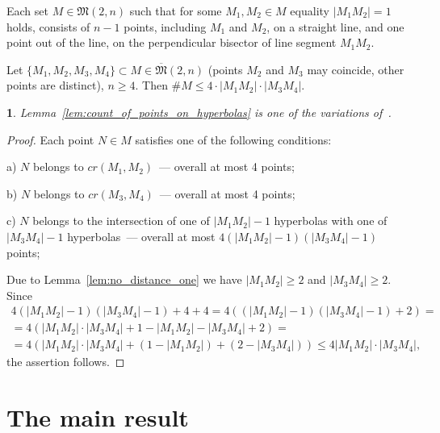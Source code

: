 \documentclass[11pt,twoside,draft
]{article}
\newtheorem{Remark}{\indent {\sc Remark}}
\begin{document}
\begin{lemma}
	\cite[Theorem 3.10]{my-pps-linear-bound-2019}
	\label{lem:no_distance_one}
	Each set $M\in\mathfrak{M}(2,n)$
	such that for some $M_1,M_2 \in M$ equality $|M_1 M_2|=1$ holds,
	consists of $n-1$ points, including $M_1$ and $M_2$, on a straight line,
	and one point out of the line, on the perpendicular bisector of line segment $M_1 M_2$.
\end{lemma}


\begin{lemma}
	\label{lem:count_of_points_on_hyperbolas}
	Let $\{M_1, M_2, M_3, M_4\} \subset M\in\overline{\mathfrak{M}}(2,n)$
	(points $M_2$ and $M_3$ may coincide, other points are distinct), $n\geq 4$.
	Then $\# M \leq 4 \cdot |M_1 M_2| \cdot |M_3 M_4|$.
\end{lemma}

\begin{Remark}
	Lemma~\ref{lem:count_of_points_on_hyperbolas} is one of the variations of~\cite{erdos1945integral}.
\end{Remark}

\begin{proof}[Proof]
	Each point $N\in M$ satisfies one of the following conditions:

	a) $N$ belongs to $cr(M_1,M_2)$~--- overall at most 4 points;

	b) $N$ belongs to $cr(M_3,M_4)$~--- overall at most 4 points;

	c) $N$ belongs to the intersection of one of $|M_1 M_2| - 1$ hyperbolas
	with one of $|M_3 M_4| - 1$ hyperbolas~--- overall at most $4 (|M_1 M_2| - 1)(|M_3 M_4| - 1)$ points;

	Due to Lemma~\ref{lem:no_distance_one} we have $|M_1 M_2| \geq 2$ and $|M_3 M_4| \geq 2$.
	Since
	\begin{multline}
		4 (|M_1 M_2| - 1)(|M_3 M_4| - 1) + 4 + 4
		=
		4 ( (|M_1 M_2| - 1)(|M_3 M_4| - 1) + 2)
		=
		\\=
		4 ( |M_1 M_2| \cdot |M_3 M_4| + 1 - |M_1 M_2| - |M_3 M_4| + 2)
		=
		\\=
		4 ( |M_1 M_2| \cdot |M_3 M_4| + (1 - |M_1 M_2|) + (2 - |M_3 M_4|))
		\leq
		4 |M_1 M_2| \cdot |M_3 M_4|
		,
	\end{multline}
	the assertion follows.
\end{proof}


\section{The main result}
\end{document}
